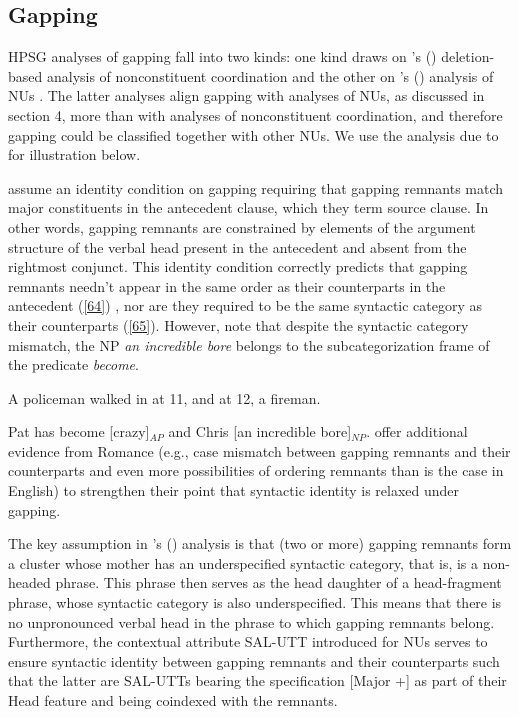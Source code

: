 \documentclass[output=paper
                ,modfonts
                ,nonflat
	        ,collection
	        ,collectionchapter
	        ,collectiontoclongg
 	        ,biblatex
                ,babelshorthands
                ,newtxmath
                ,draftmode
                ,colorlinks, citecolor=brown
]{./langsci/langscibook}
\begin{document}
{\subsection{Gapping}
HPSG analyses of gapping fall into two kinds: one kind draws on \citeauthor{Beavers2004}'s (\citeyear{Beavers2004}) deletion-based analysis of nonconstituent coordination \citep{Chaves2009} and the other on \citeauthor{Ginzburg:Sag:2000}'s (\citeyear{Ginzburg:Sag:2000}) analysis of NUs \citep{Abeille2014, Park2018}. The latter analyses align gapping with analyses of NUs, as discussed in section 4, more than with analyses of nonconstituent coordination, and therefore gapping could be classified together with other NUs. We use the analysis due to \citet{Abeille2014} for illustration below.

\citet{Abeille2014} assume an identity condition on gapping requiring that gapping remnants match major constituents in the antecedent clause, which they term source clause. In other words, gapping remnants are constrained by elements of the argument structure of the verbal head present in the antecedent and absent from the rightmost conjunct. %
This identity condition correctly predicts that gapping remnants needn't appear in the same order as their counterparts in the antecedent (\ref{64}) \citep[see][156--158]{Sag1985}, nor are they required to be the same syntactic category as their counterparts (\ref{65}). However, note that despite the syntactic category mismatch, the NP {\it an incredible bore} belongs to the subcategorization frame of the predicate {\it become}.

\ea A policeman walked in at 11, and at 12, a fireman. \label{64}\z

\ea Pat has become [crazy]$_{AP}$ and Chris [an incredible bore]$_{NP}$.  \label{65}\z
\citet{Abeille2014} offer additional evidence from Romance (e.g., case mismatch between gapping remnants and their counterparts and even more possibilities of ordering remnants than is the case in English) to strengthen their point that syntactic identity is relaxed under gapping.


The key assumption in \citeauthor{Abeille2014}'s (\citeyear{Abeille2014}) analysis is that (two or more) gapping remnants form a cluster whose mother has an underspecified syntactic category, that is, is a non-headed phrase. This phrase then serves as the head daughter of a head-fragment phrase, whose syntactic category is also underspecified. This means that there is no unpronounced verbal head in the phrase to which gapping remnants belong. Furthermore, the contextual attribute SAL-UTT introduced for NUs serves to ensure syntactic identity between gapping remnants and their counterparts such that the latter are SAL-UTTs bearing the specification [Major +] as part of their Head feature and being coindexed with the remnants.

}
\end{document}
